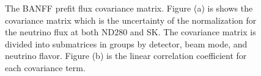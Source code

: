 \begin{figure}
\centering{}\caption[The BANFF Prefit Flux Covariance Matrix]{The BANFF prefit flux covariance matrix. Figure (a) is shows the covariance
matrix which is the uncertainty of the normalization for the neutrino
flux at both ND280 and SK. The covariance matrix is divided into submatrices
in groups by detector, beam mode, and neutrino flavor. Figure (b)
is the linear correlation coefficient for each covariance term. \label{fig:BANFF-pre-fit-flux-covariance}}
\end{figure}

